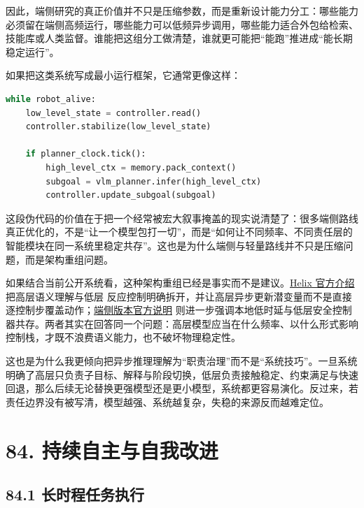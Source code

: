 因此，端侧研究的真正价值并不只是压缩参数，而是重新设计能力分工：哪些能力必须留在端侧高频运行，哪些能力可以低频异步调用，哪些能力适合外包给检索、技能库或人类监督。谁能把这组分工做清楚，谁就更可能把“能跑”推进成“能长期稳定运行”。

如果把这类系统写成最小运行框架，它通常更像这样：

\begin{lstlisting}[language=python]
while robot_alive:
    low_level_state = controller.read()
    controller.stabilize(low_level_state)

    if planner_clock.tick():
        high_level_ctx = memory.pack_context()
        subgoal = vlm_planner.infer(high_level_ctx)
        controller.update_subgoal(subgoal)
\end{lstlisting}

这段伪代码的价值在于把一个经常被宏大叙事掩盖的现实说清楚了：很多端侧路线真正优化的，不是“让一个模型包打一切”，而是“如何让不同频率、不同责任层的智能模块在同一系统里稳定共存”。这也是为什么端侧与轻量路线并不只是压缩问题，而是架构重组问题。

如果结合当前公开系统看，这种架构重组已经是事实而不是建议。\href{https://www.figure.ai/news/helix}{Helix 官方介绍} 把高层语义理解与低层 \texttt{} 反应控制明确拆开，并让高层异步更新潜变量而不是直接逐控制步覆盖动作；\href{https://deepmind.google/blog/gemini-robotics-on-device-brings-ai-to-local-robotic-devices/}{端侧版本官方说明} 则进一步强调本地低时延与低层安全控制器共存。两者其实在回答同一个问题：高层模型应当在什么频率、以什么形式影响控制栈，才既不浪费语义能力，也不破坏物理稳定性。

这也是为什么我更倾向把异步推理理解为“职责治理”而不是“系统技巧”。一旦系统明确了高层只负责子目标、解释与阶段切换，低层负责接触稳定、约束满足与快速回退，那么后续无论替换更强模型还是更小模型，系统都更容易演化。反过来，若责任边界没有被写清，模型越强、系统越复杂，失稳的来源反而越难定位。

\section*{84. 持续自主与自我改进}

\subsection*{84.1 长时程任务执行}


